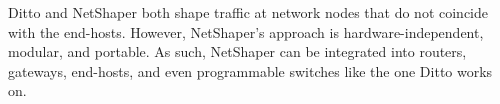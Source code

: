 Ditto \cite{meier2022ditto} and NetShaper both shape traffic at network nodes that do not coincide with the end-hosts.
However, NetShaper's approach is hardware-independent, modular, and portable.
As such, NetShaper can be integrated into routers, gateways, end-hosts, and even programmable switches like the one Ditto works on.
